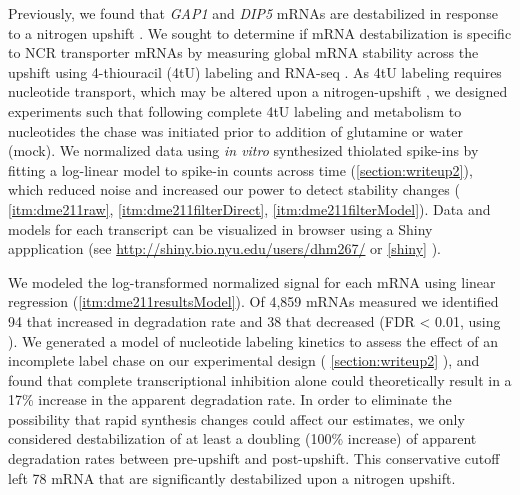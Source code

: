 Previously, we found that \textit{GAP1} and \textit{DIP5} mRNAs 
are destabilized in
response to a nitrogen upshift \parencite{airoldi2016steady}. We sought to
determine if mRNA destabilization is specific to NCR transporter
mRNAs by measuring global mRNA stability across the upshift
using 4-thiouracil (4tU) labeling and RNA-seq 
\parencite{neymotin2014determination,munchel2011dynamic}.
As 4tU labeling requires nucleotide transport, which may be altered
upon a nitrogen-upshift \parencite{hein1995npi1}, we designed experiments such
that following complete 4tU labeling and metabolism to nucleotides 
the chase was initiated prior to addition of glutamine or water (mock).
We normalized data using \textit{in vitro} synthesized thiolated 
spike-ins by fitting a log-linear model to spike-in counts
across time (\autoref{section:writeup2}), which reduced noise and increased
our power to detect stability changes (
\autoref{itm:dme211raw},
\autoref{itm:dme211filterDirect},
\autoref{itm:dme211filterModel}).
Data and models for each transcript can be visualized in browser
using a Shiny appplication (see
\url{http://shiny.bio.nyu.edu/users/dhm267/} or \autoref{shiny} ). 

We modeled the
log-transformed normalized signal for each mRNA using linear
regression (\autoref{itm:dme211resultsModel}).
Of 4,859 mRNAs measured we identified 94 that increased in 
degradation rate and 38 that decreased (FDR < 0.01, using
\cite{storey2003statistical}). 
We generated a model of nucleotide
labeling kinetics to assess the effect of an incomplete label 
chase on our experimental design ( \autoref{section:writeup2} ),
 and found that complete transcriptional inhibition alone could 
theoretically result in a 17\% increase in the apparent 
degradation rate. In order to eliminate the possibility that
rapid synthesis changes could affect our estimates,
we only considered destabilization of at least a
doubling (100\% increase) of apparent degradation rates between 
pre-upshift and post-upshift.
This conservative cutoff 
left 78 mRNA that are significantly destabilized 
upon a nitrogen upshift. 

